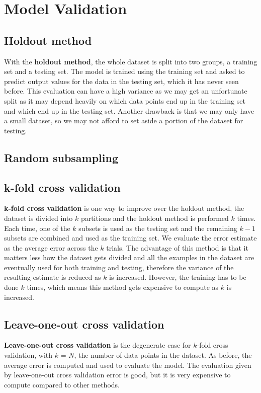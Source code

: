 \documentclass[11pt,fleqn]{book} %
\begin{document}
\section{Model Validation}
\subsection{Holdout method}
With the \textbf{holdout method}, the whole dataset is split into two groups, a training set and a testing set. The model is trained using the training set and asked to predict output values for the data in the testing set, which it has never seen before. This evaluation can have a high variance as we may get an unfortunate split as it may depend heavily on which data points end up in the training set and which end up in the testing set. Another drawback is that we may only have a small dataset, so we may not afford to set aside a portion of the dataset for testing.

\subsection{Random subsampling}

\subsection{k-fold cross validation}
\textbf{k-fold cross validation} is one way to improve over the holdout method, the dataset is divided into $k$ partitions and the holdout method is performed $k$ times. Each time, one of the $k$ subsets is used as the testing set and the remaining $k - 1$ subsets are combined and used as the training set. We evaluate the error estimate as the average error across the $k$ trials. The advantage of this method is that it matters less how the dataset gets divided and all the examples in the dataset are eventually used for both training and testing, therefore the variance of the resulting estimate is reduced as $k$ is increased. However, the training has to be done $k$ times, which means this method gets expensive to compute as $k$ is increased.

\subsection{Leave-one-out cross validation}
\textbf{Leave-one-out cross validation} is the degenerate case for $k$-fold cross validation, with $k$ = $N$, the number of data points in the dataset. As before, the average error is computed and used to evaluate the model. The evaluation given by leave-one-out cross validation error is good, but it is very expensive to compute compared to other methods.
\end{document}
